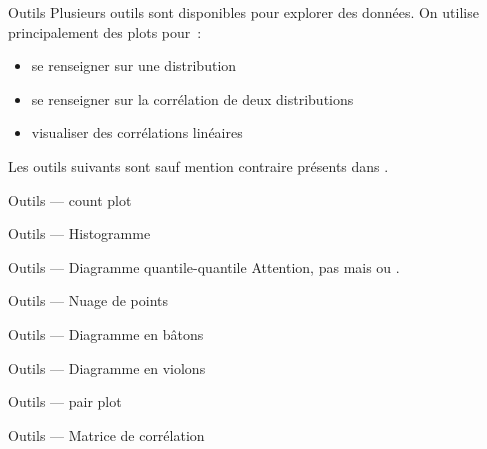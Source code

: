 \begin{frame}{Outils}
    Plusieurs outils sont disponibles pour explorer des données. On
    utilise principalement des plots pour :
    \begin{itemize}
    \item se renseigner sur une distribution
    \item se renseigner sur la corrélation de deux distributions
    \item visualiser des corrélations linéaires
    \end{itemize}
    Les outils suivants sont sauf mention contraire présents dans
    .
  \end{frame}
  
  \begin{frame}{Outils — count plot}
  \end{frame}
  
  \begin{frame}{Outils — Histogramme}
  \end{frame}
  
  \begin{frame}{Outils — Diagramme quantile-quantile}
    Attention, pas 
    mais
    ou
    .
  \end{frame}
  
  \begin{frame}{Outils — Nuage de points}
  \end{frame}
  
  \begin{frame}{Outils — Diagramme en bâtons}
  \end{frame}
  
  \begin{frame}{Outils — Diagramme en violons}
  \end{frame}
  
  \begin{frame}{Outils — pair plot}
  \end{frame}
  
  \begin{frame}{Outils — Matrice de corrélation}
  \end{frame}